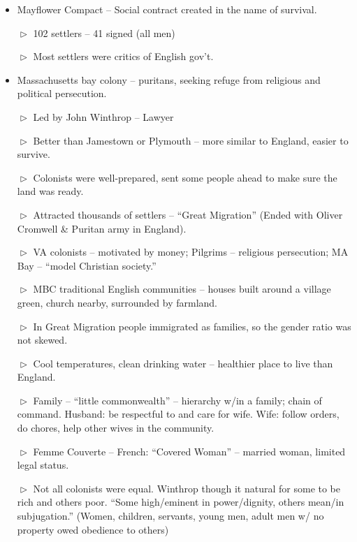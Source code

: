 \documentclass[10pt]{article}
\begin{document}
\begin{flushleft}
\begin{multicols}{2}
\begin{itemize}
 \item Mayflower Compact – Social contract created in the name of survival.
 \item[$\vartriangleright$] 102 settlers – 41 signed (all men)
 \item[$\vartriangleright$] Most settlers were critics of English gov’t.
 \item Massachusetts bay colony – puritans, seeking refuge from religious and political persecution.
 \item[$\vartriangleright$] Led by John Winthrop – Lawyer 
 \item[$\vartriangleright$] Better than Jamestown or Plymouth – more similar to England, easier to survive.
 \item[$\vartriangleright$] Colonists were well-prepared, sent some people ahead to make sure the land was ready.
 \item[$\vartriangleright$] Attracted thousands of settlers – “Great Migration” (Ended with Oliver Cromwell \& Puritan army in England).
 \item[$\vartriangleright$] VA colonists – motivated by money; Pilgrims – religious persecution; MA Bay – ``model Christian society.''
\item[$\vartriangleright$] MBC traditional English communities – houses built around a village green, church nearby, surrounded by farmland.
 \item[$\vartriangleright$] In Great Migration people immigrated as families, so the gender ratio was not skewed.
 \item[$\vartriangleright$] Cool temperatures, clean drinking water – healthier place to live than England.
 \item[$\vartriangleright$] Family – “little commonwealth” – hierarchy w/in a family; chain of command. Husband: be respectful to and care for wife. Wife: follow orders, do chores, help other wives in the community.
 \item[$\vartriangleright$] Femme Couverte – French: “Covered Woman” – married woman, limited legal status.
 \item[$\vartriangleright$] Not all colonists were equal. Winthrop though it natural for some to be rich and others poor. “Some high/eminent in power/dignity, others mean/in subjugation.” (Women, children, servants, young men, adult men w/ no property owed obedience to others)

\end{itemize}
\end{multicols}
\end{flushleft}
\end{document}
